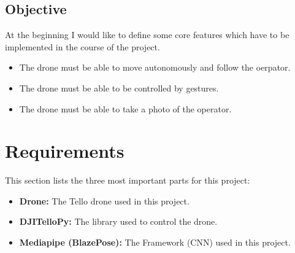 \documentclass[a4paper,11pt,singlespacing]{article}
\begin{document}
\subsection{Objective}
At the beginning I would like to define some core features which have to be 
implemented in the course of the project.
\begin{itemize}
	\item The drone must be able to move autonomously and follow the oerpator.
	\item The drone must be able to be controlled by gestures.
	\item The drone must be able to take a photo of the operator.
\end{itemize}





\pagebreak
\section{Requirements}
This section lists the three most important parts for this project:
\begin{itemize}
	\item \textbf{Drone:} The Tello drone used in this project.
	\item \textbf{DJITelloPy:} The library used to control the drone.
	\item \textbf{Mediapipe (BlazePose):} The Framework (CNN) used in this project.
	
\end{itemize}
\end{document}
